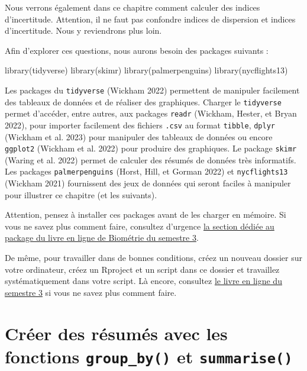 \documentclass[
  a4paper,
  DIV=11,
  numbers=noendperiod,
  oneside]{scrreprt}
\newenvironment{Shaded}{}{}
\newcommand{\FunctionTok}[1]{\textcolor[rgb]{0.44,0.26,0.76}{#1}}
\newcommand{\NormalTok}[1]{\textcolor[rgb]{0.14,0.16,0.18}{#1}}
\begin{document}
Nous verrons également dans ce chapitre comment calculer des indices
d'incertitude. Attention, il ne faut pas confondre indices de dispersion
et indices d'incertitude. Nous y reviendrons plus loin.

Afin d'explorer ces questions, nous aurons besoin des packages suivants
:

\begin{Shaded}
\begin{Highlighting}[]
\FunctionTok{library}\NormalTok{(tidyverse)}
\FunctionTok{library}\NormalTok{(skimr)}
\FunctionTok{library}\NormalTok{(palmerpenguins)}
\FunctionTok{library}\NormalTok{(nycflights13)}
\end{Highlighting}
\end{Shaded}

Les packages du \texttt{tidyverse} (Wickham 2022) permettent de
manipuler facilement des tableaux de données et de réaliser des
graphiques. Charger le \texttt{tidyverse} permet d'accéder, entre
autres, aux packages \texttt{readr} (Wickham, Hester, et Bryan 2022),
pour importer facilement des fichiers \texttt{.csv} au format
\texttt{tibble}, \texttt{dplyr} (Wickham et al. 2023) pour manipuler des
tableaux de données ou encore \texttt{ggplot2} (Wickham et al. 2022)
pour produire des graphiques. Le package \texttt{skimr} (Waring et al.
2022) permet de calculer des résumés de données très informatifs. Les
packages \texttt{palmerpenguins} (Horst, Hill, et Gorman 2022) et
\texttt{nycflights13} (Wickham 2021) fournissent des jeux de données qui
seront faciles à manipuler pour illustrer ce chapitre (et les suivants).

Attention, pensez à installer ces packages avant de les charger en
mémoire. Si vous ne savez plus comment faire, consultez d'urgence
\href{https://besibo.github.io/BiometrieS3/01-R-basics.html\#sec-packages}{la
section dédiée au package du livre en ligne de Biométrie du semestre 3}.

De même, pour travailler dans de bonnes conditions, créez un nouveau
dossier sur votre ordinateur, créez un Rproject et un script dans ce
dossier et travaillez systématiquement dans votre script. Là encore,
consultez
\href{https://besibo.github.io/BiometrieS3/01-R-basics.html\#sec-code}{le
livre en ligne du semestre 3} si vous ne savez plus comment faire.

\hypertarget{cruxe9er-des-ruxe9sumuxe9s-avec-les-fonctions-group_by-et-summarise}{%
\section{\texorpdfstring{Créer des résumés avec les fonctions
\texttt{group\_by()} et
\texttt{summarise()}}{Créer des résumés avec les fonctions group\_by() et summarise()}}\label{cruxe9er-des-ruxe9sumuxe9s-avec-les-fonctions-group_by-et-summarise}}
\end{document}
